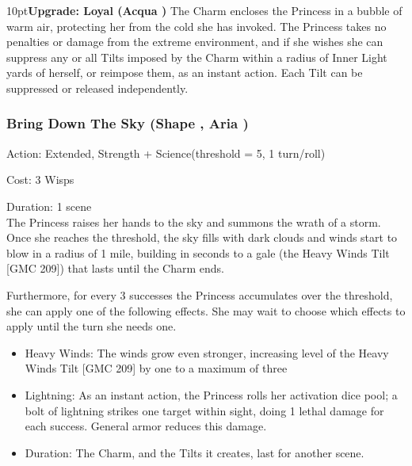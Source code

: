 \begin{myindentpar}{10pt}\textbf{Upgrade: Loyal (Acqua \textbullet\textbullet\textbullet\textbullet)}
The Charm encloses the Princess in a bubble of warm air, protecting her from the cold she has invoked. The Princess takes no penalties or damage from the extreme environment, and if she wishes she can suppress any or all Tilts imposed by the Charm within a radius of Inner Light yards of herself, or reimpose them, as an instant action. Each Tilt can be suppressed or released independently.\end{myindentpar}
                                                                                                                                                                                                                                                                                                                                                                                                       

\subsubsection*{Bring Down The Sky (Shape \textbullet\textbullet\textbullet\textbullet, Aria \textbullet\textbullet\textbullet)}

\noindent Action: Extended, Strength + Science(threshold = 5, 1 turn/roll)

\noindent Cost: 3 Wisps

\noindent Duration: 1 scene \\

\noindent The Princess raises her hands to the sky and summons the wrath of a storm. Once she reaches the threshold, the sky fills with dark clouds and winds start to blow in a radius of 1 mile, building in seconds to a gale (the Heavy Winds Tilt [GMC 209]) that lasts until the Charm ends. 

Furthermore, for every 3 successes the Princess accumulates over the threshold, she can apply one of the following effects. She may wait to choose which effects to apply until the turn she needs one.

\begin{itemize} 
 \item Heavy Winds: The winds grow even stronger, increasing level of the Heavy Winds Tilt [GMC 209] by one to a maximum of three
 \item Lightning: As an instant action, the Princess rolls her activation dice pool; a bolt of lightning strikes one target within sight, doing 1 lethal damage for each success. General armor reduces this damage.
 \item Duration: The Charm, and the Tilts it creates, last for another scene.\end{itemize}

